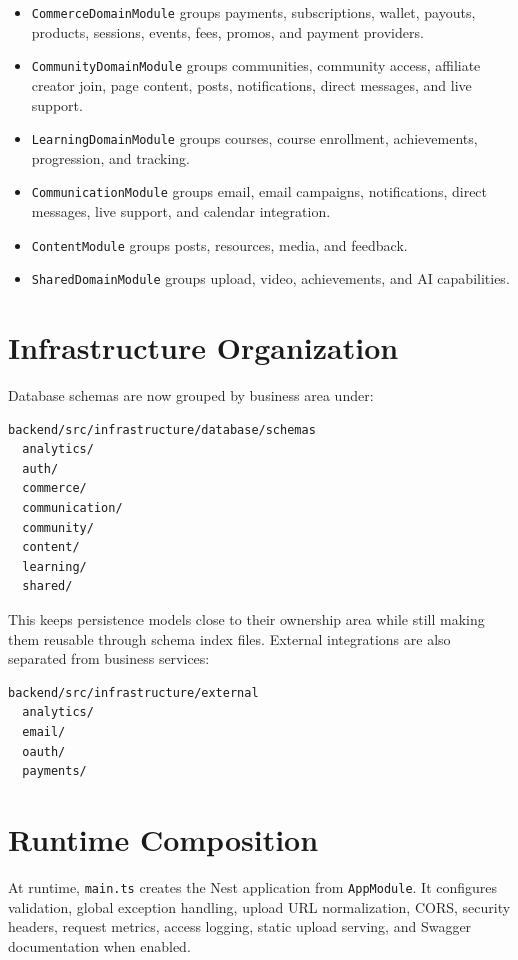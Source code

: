 \documentclass[11pt,a4paper]{article}
\begin{document}
\begin{itemize}
  \item \texttt{CommerceDomainModule} groups payments, subscriptions, wallet, payouts, products, sessions, events, fees, promos, and payment providers.
  \item \texttt{CommunityDomainModule} groups communities, community access, affiliate creator join, page content, posts, notifications, direct messages, and live support.
  \item \texttt{LearningDomainModule} groups courses, course enrollment, achievements, progression, and tracking.
  \item \texttt{CommunicationModule} groups email, email campaigns, notifications, direct messages, live support, and calendar integration.
  \item \texttt{ContentModule} groups posts, resources, media, and feedback.
  \item \texttt{SharedDomainModule} groups upload, video, achievements, and AI capabilities.
\end{itemize}

\section*{Infrastructure Organization}

Database schemas are now grouped by business area under:

\begin{verbatim}
backend/src/infrastructure/database/schemas
  analytics/
  auth/
  commerce/
  communication/
  community/
  content/
  learning/
  shared/
\end{verbatim}

This keeps persistence models close to their ownership area while still making them reusable through schema index files. External integrations are also separated from business services:

\begin{verbatim}
backend/src/infrastructure/external
  analytics/
  email/
  oauth/
  payments/
\end{verbatim}

\section*{Runtime Composition}

At runtime, \texttt{main.ts} creates the Nest application from \texttt{AppModule}. It configures validation, global exception handling, upload URL normalization, CORS, security headers, request metrics, access logging, static upload serving, and Swagger documentation when enabled.
\end{document}
